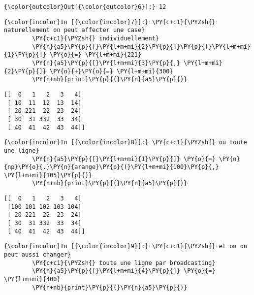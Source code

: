 \begin{Verbatim}[commandchars=\\\{\},frame=single,framerule=0.3mm,rulecolor=\color{cellframecolor}]
{\color{outcolor}Out[{\color{outcolor}6}]:} 12
\end{Verbatim}
            
    \begin{Verbatim}[commandchars=\\\{\},frame=single,framerule=0.3mm,rulecolor=\color{cellframecolor}]
{\color{incolor}In [{\color{incolor}7}]:} \PY{c+c1}{\PYZsh{} naturellement on peut affecter une case}
        \PY{c+c1}{\PYZsh{} individuellement}
        \PY{n}{a5}\PY{p}{[}\PY{l+m+mi}{2}\PY{p}{]}\PY{p}{[}\PY{l+m+mi}{1}\PY{p}{]} \PY{o}{=} \PY{l+m+mi}{221}
        \PY{n}{a5}\PY{p}{[}\PY{l+m+mi}{3}\PY{p}{,} \PY{l+m+mi}{2}\PY{p}{]} \PY{o}{+}\PY{o}{=} \PY{l+m+mi}{300}
        \PY{n+nb}{print}\PY{p}{(}\PY{n}{a5}\PY{p}{)}
\end{Verbatim}


    \begin{Verbatim}[commandchars=\\\{\},frame=single,framerule=0.3mm,rulecolor=\color{cellframecolor}]
[[  0   1   2   3   4]
 [ 10  11  12  13  14]
 [ 20 221  22  23  24]
 [ 30  31 332  33  34]
 [ 40  41  42  43  44]]
\end{Verbatim}

    \begin{Verbatim}[commandchars=\\\{\},frame=single,framerule=0.3mm,rulecolor=\color{cellframecolor}]
{\color{incolor}In [{\color{incolor}8}]:} \PY{c+c1}{\PYZsh{} ou toute une ligne}
        \PY{n}{a5}\PY{p}{[}\PY{l+m+mi}{1}\PY{p}{]} \PY{o}{=} \PY{n}{np}\PY{o}{.}\PY{n}{arange}\PY{p}{(}\PY{l+m+mi}{100}\PY{p}{,} \PY{l+m+mi}{105}\PY{p}{)}
        \PY{n+nb}{print}\PY{p}{(}\PY{n}{a5}\PY{p}{)}
\end{Verbatim}


    \begin{Verbatim}[commandchars=\\\{\},frame=single,framerule=0.3mm,rulecolor=\color{cellframecolor}]
[[  0   1   2   3   4]
 [100 101 102 103 104]
 [ 20 221  22  23  24]
 [ 30  31 332  33  34]
 [ 40  41  42  43  44]]
\end{Verbatim}

    \begin{Verbatim}[commandchars=\\\{\},frame=single,framerule=0.3mm,rulecolor=\color{cellframecolor}]
{\color{incolor}In [{\color{incolor}9}]:} \PY{c+c1}{\PYZsh{} et on on peut aussi changer}
        \PY{c+c1}{\PYZsh{} toute une ligne par broadcasting}
        \PY{n}{a5}\PY{p}{[}\PY{l+m+mi}{4}\PY{p}{]} \PY{o}{=} \PY{l+m+mi}{400}
        \PY{n+nb}{print}\PY{p}{(}\PY{n}{a5}\PY{p}{)}
\end{Verbatim}


